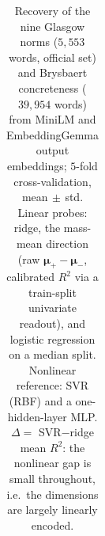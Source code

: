 \begin{table}[t]
\begin{tabular}{@{}llcccccc@{}}
    \bottomrule
  \end{tabular}
  \caption{Recovery of the nine Glasgow norms ($5{,}553$ words, official set) and
  Brysbaert concreteness ($39{,}954$ words) from MiniLM and EmbeddingGemma output
  embeddings; $5$-fold cross-validation, mean$\,\pm\,$std. Linear probes: ridge, the
  mass-mean direction (raw $\bm{\mu}_{+}-\bm{\mu}_{-}$, calibrated $R^2$ via a
  train-split univariate readout), and logistic regression on a median split.
  Nonlinear reference: SVR (RBF) and a one-hidden-layer MLP. $\Delta=$ SVR$-$ridge
  mean $R^2$: the nonlinear gap is small throughout, i.e.\ the dimensions are
  largely linearly encoded.}
  \label{tab:probes-full}
\end{table}
